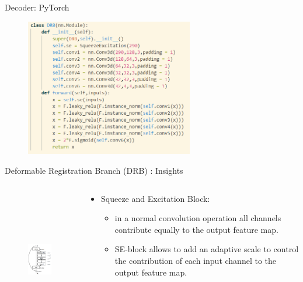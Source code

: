\documentclass{beamer}
\begin{document}
\begin{frame}{Decoder: PyTorch}

    \begin{figure}
        \centering
        \includegraphics[height=6cm]{drb.PNG}
        \label{fig:code_decoder_3}
    \end{figure}
    
\end{frame}

\begin{frame}{Deformable Registration Branch (DRB) : Insights}
    \begin{columns}
		\begin{column}{4cm}
			\begin{figure}
  				\includegraphics[height=6cm]{senet.png}
			\end{figure}
        \end{column}
        \begin{column}{6cm}
            \begin{itemize}
                \item Squeeze and Excitation Block:
                    \begin{itemize}
                        \item in a normal convolution operation all channels contribute equally to the output feature map.
                        \item SE-block allows to add an adaptive scale to control the contribution of each input channel to the output feature map.
                    \end{itemize}
            \end{itemize}
        \end{column}
    \end{columns}
    
\end{frame}
\end{document}
